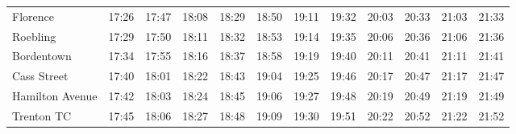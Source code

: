 \begin{center}
\begin{tabular}{@{}lrrrrrrrrrrr@{}}
Florence & 17:26 & 17:47 & 18:08 & 18:29 & 18:50 & 19:11 & 19:32 & 20:03 & 20:33 & 21:03 & 21:33 \\
Roebling & 17:29 & 17:50 & 18:11 & 18:32 & 18:53 & 19:14 & 19:35 & 20:06 & 20:36 & 21:06 & 21:36 \\
Bordentown & 17:34 & 17:55 & 18:16 & 18:37 & 18:58 & 19:19 & 19:40 & 20:11 & 20:41 & 21:11 & 21:41 \\
Cass Street & 17:40 & 18:01 & 18:22 & 18:43 & 19:04 & 19:25 & 19:46 & 20:17 & 20:47 & 21:17 & 21:47 \\
Hamilton Avenue & 17:42 & 18:03 & 18:24 & 18:45 & 19:06 & 19:27 & 19:48 & 20:19 & 20:49 & 21:19 & 21:49 \\
Trenton TC & 17:45 & 18:06 & 18:27 & 18:48 & 19:09 & 19:30 & 19:51 & 20:22 & 20:52 & 21:22 & 21:52 \\
\bottomrule\end{tabular}\end{center}
